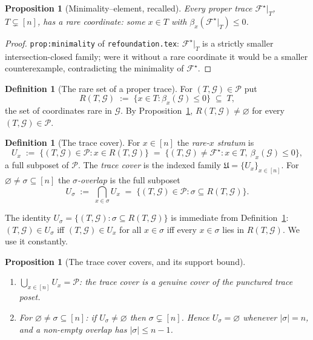 \documentclass[11pt,oneside]{amsart}
\theoremstyle{plain}
\newtheorem{proposition}[theorem]{Proposition}
\theoremstyle{definition}
\newtheorem{definition}[theorem]{Definition}
\theoremstyle{remark}
\theoremstyle{honeststyle}
\newcommand{\F}{\mathcal{F}}
\newcommand{\G}{\mathcal{G}}
\newcommand{\Fstar}{\F^{\star}}
\newcommand{\bias}{\beta}
\newcommand{\Pp}{\mathcal{P}}
\newcommand{\Uf}{\mathfrak{U}}
\newcommand{\rare}{R}
\begin{document}
\begin{proposition}[Minimality--element, recalled]
\label{prop:minimality}
Every proper trace $\Fstar|_{T}$, $T\subsetneq[n]$, has a rare
coordinate: some $x\in T$ with $\bias_{x}(\Fstar|_{T})\le0$.
\end{proposition}

\begin{proof}
\texttt{prop:minimality} of \texttt{refoundation.tex}: $\Fstar|_{T}$
is a strictly smaller intersection-closed family; were it without a
rare coordinate it would be a smaller counterexample, contradicting
the minimality of $\Fstar$.
\end{proof}

\begin{definition}[The rare set of a proper trace]
\label{def:rareset}
For $(T,\G)\in\Pp$ put
\[
  \rare(T,\G)\;:=\;\{x\in T:\bias_{x}(\G)\le0\}\;\subseteq\;T,
\]
the set of coordinates rare in $\G$. By Proposition~\ref{prop:minimality},
$\rare(T,\G)\neq\varnothing$ for every $(T,\G)\in\Pp$.
\end{definition}

\begin{definition}[The trace cover]
\label{def:cover}
For $x\in[n]$ the \emph{rare-$x$ stratum} is
\[
  U_{x}\;:=\;\{(T,\G)\in\Pp:x\in\rare(T,\G)\}
   \;=\;\{(T,\G)\neq\Fstar:x\in T,\ \bias_{x}(\G)\le0\},
\]
a full subposet of $\Pp$. The \emph{trace cover} is the indexed family
$\Uf=\{U_{x}\}_{x\in[n]}$. For $\varnothing\neq\sigma\subseteq[n]$ the
\emph{$\sigma$-overlap} is the full subposet
\[
  U_{\sigma}\;:=\;\bigcap_{x\in\sigma}U_{x}
   \;=\;\{(T,\G)\in\Pp:\sigma\subseteq\rare(T,\G)\}.
\]
\end{definition}

The identity $U_{\sigma}=\{(T,\G):\sigma\subseteq\rare(T,\G)\}$ is
immediate from Definition~\ref{def:cover}: $(T,\G)\in U_{\sigma}$ iff
$(T,\G)\in U_{x}$ for all $x\in\sigma$ iff every $x\in\sigma$ lies in
$\rare(T,\G)$. We use it constantly.

\begin{proposition}[The trace cover covers, and its support bound]
\label{prop:cover}
\begin{enumerate}[label=\textup{(\arabic*)},leftmargin=2.4em]
\item $\bigcup_{x\in[n]}U_{x}=\Pp$: the trace cover is a genuine cover
  of the punctured trace poset.
\item For $\varnothing\neq\sigma\subseteq[n]$: if $U_{\sigma}\neq
  \varnothing$ then $\sigma\subsetneq[n]$. Hence $U_{\sigma}=\varnothing$
  whenever $|\sigma|=n$, and a non-empty overlap has $|\sigma|\le n-1$.
\end{enumerate}
\end{proposition}
\end{document}
